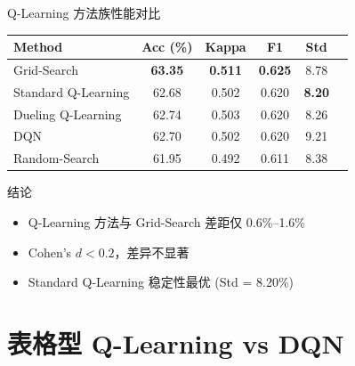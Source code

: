 \begin{frame}{Q-Learning 方法族性能对比}
    \begin{table}[h]
        \centering
        \footnotesize
        \begin{tabular}{lccccc}
            \hline
            \textbf{Method} & \textbf{Acc (\%)} & \textbf{Kappa} & \textbf{F1} & \textbf{Std} \\
            \hline
            Grid-Search & \textbf{63.35} & \textbf{0.511} & \textbf{0.625} & 8.78 \\
            Standard Q-Learning & 62.68 & 0.502 & 0.620 & \textbf{8.20} \\
            Dueling Q-Learning & 62.74 & 0.503 & 0.620 & 8.26 \\
            DQN & 62.70 & 0.502 & 0.620 & 9.21 \\
            Random-Search & 61.95 & 0.492 & 0.611 & 8.38 \\
            \hline
        \end{tabular}
    \end{table}
    
    \vspace{0.3cm}
    \begin{exampleblock}{结论}
        \begin{itemize}
            \item Q-Learning 方法与 Grid-Search 差距仅 0.6\%--1.6\%
            \item Cohen's $d < 0.2$，差异不显著
            \item Standard Q-Learning 稳定性最优 (Std = 8.20\%)
        \end{itemize}
    \end{exampleblock}
\end{frame}

\section{表格型 Q-Learning vs DQN}

